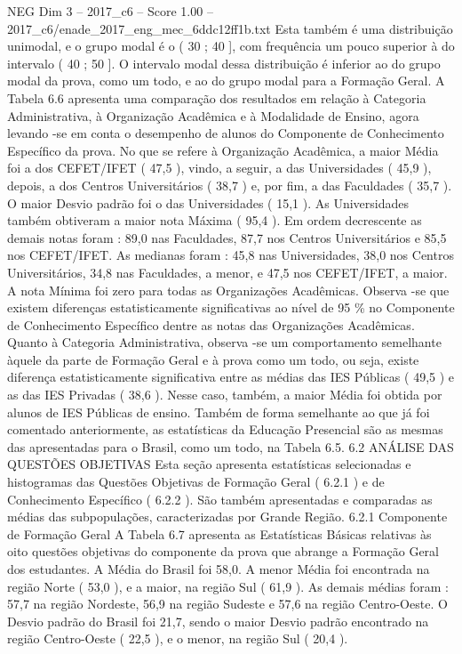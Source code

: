 \begin{textsample}{NEG Dim 3 – 2017\_c6 – Score 1.00 – 2017\_c6/enade\_2017\_eng\_mec\_6ddc12ff1b.txt}
Esta também é uma distribuição unimodal, e o grupo modal é o ( 30 ; 40 ], com frequência um pouco superior à do intervalo ( 40 ; 50 ].
O intervalo modal dessa distribuição é inferior ao do grupo modal da prova, como um todo, e ao do grupo modal para a Formação Geral.
A Tabela 6.6 apresenta uma comparação dos resultados em relação à Categoria Administrativa, à Organização Acadêmica e à Modalidade de Ensino, agora levando -se em conta o desempenho de alunos do Componente de Conhecimento Específico da prova.
No que se refere à Organização Acadêmica, a maior Média foi a dos CEFET/IFET ( 47,5 ), vindo, a seguir, a das Universidades ( 45,9 ), depois, a dos Centros Universitários ( 38,7 ) e, por fim, a das Faculdades ( 35,7 ).
O maior Desvio padrão foi o das Universidades ( 15,1 ).
As Universidades também obtiveram a maior nota Máxima ( 95,4 ).
Em ordem decrescente as demais notas foram : 89,0 nas Faculdades, 87,7 nos Centros Universitários e 85,5 nos CEFET/IFET.
As medianas foram : 45,8 nas Universidades, 38,0 nos Centros Universitários, 34,8 nas Faculdades, a menor, e 47,5 nos CEFET/IFET, a maior.
A nota Mínima foi zero para todas as Organizações Acadêmicas.
Observa -se que existem diferenças estatisticamente significativas ao nível de 95 \% no Componente de Conhecimento Específico dentre as notas das Organizações Acadêmicas.
Quanto à Categoria Administrativa, observa -se um comportamento semelhante àquele da parte de Formação Geral e à prova como um todo, ou seja, existe diferença estatisticamente significativa entre as médias das IES Públicas ( 49,5 ) e as das IES Privadas ( 38,6 ).
Nesse caso, também, a maior Média foi obtida por alunos de IES Públicas de ensino.
Também de forma semelhante ao que já foi comentado anteriormente, as estatísticas da Educação Presencial são as mesmas das apresentadas para o Brasil, como um todo, na Tabela 6.5. 6.2 ANÁLISE DAS QUESTÕES OBJETIVAS Esta seção apresenta estatísticas selecionadas e histogramas das Questões Objetivas de Formação Geral ( 6.2.1 ) e de Conhecimento Específico ( 6.2.2 ).
São também apresentadas e comparadas as médias das subpopulações, caracterizadas por Grande Região. 6.2.1 Componente de Formação Geral A Tabela 6.7 apresenta as Estatísticas Básicas relativas às oito questões objetivas do componente da prova que abrange a Formação Geral dos estudantes.
A Média do Brasil foi 58,0.
A menor Média foi encontrada na região Norte ( 53,0 ), e a maior, na região Sul ( 61,9 ).
As demais médias foram : 57,7 na região Nordeste, 56,9 na região Sudeste e 57,6 na região Centro-Oeste.
O Desvio padrão do Brasil foi 21,7, sendo o maior Desvio padrão encontrado na região Centro-Oeste ( 22,5 ), e o menor, na região Sul ( 20,4 ).

\end{textsample}
